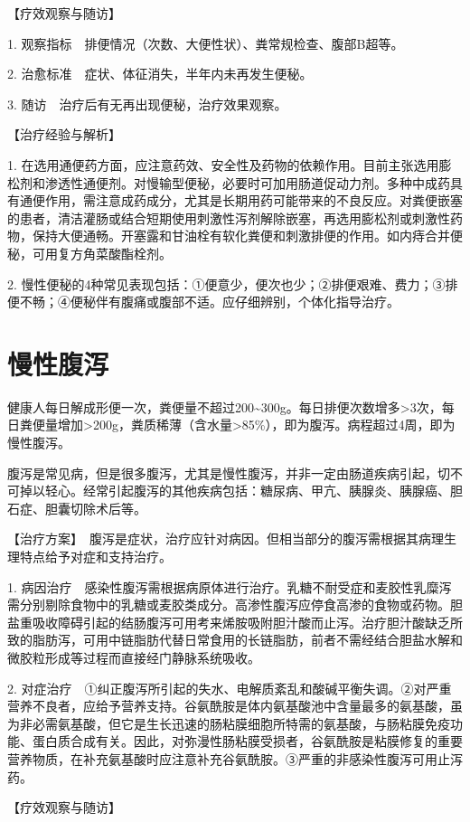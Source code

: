 【疗效观察与随访】

1. 观察指标　排便情况（次数、大便性状）、粪常规检查、腹部B超等。

2. 治愈标准　症状、体征消失，半年内未再发生便秘。

3. 随访　治疗后有无再出现便秘，治疗效果观察。

【治疗经验与解析】

1.
在选用通便药方面，应注意药效、安全性及药物的依赖作用。目前主张选用膨松剂和渗透性通便剂。对慢输型便秘，必要时可加用肠道促动力剂。多种中成药具有通便作用，需注意成药成分，尤其是长期用药可能带来的不良反应。对粪便嵌塞的患者，清洁灌肠或结合短期使用刺激性泻剂解除嵌塞，再选用膨松剂或刺激性药物，保持大便通畅。开塞露和甘油栓有软化粪便和刺激排便的作用。如内痔合并便秘，可用复方角菜酸酯栓剂。

2.
慢性便秘的4种常见表现包括：①便意少，便次也少；②排便艰难、费力；③排便不畅；④便秘伴有腹痛或腹部不适。应仔细辨别，个体化指导治疗。

\section{慢性腹泻}

健康人每日解成形便一次，粪便量不超过200\textasciitilde{}300g。每日排便次数增多\textgreater{}3次，每日粪便量增加\textgreater{}200g，粪质稀薄（含水量\textgreater{}85\%），即为腹泻。病程超过4周，即为慢性腹泻。

腹泻是常见病，但是很多腹泻，尤其是慢性腹泻，并非一定由肠道疾病引起，切不可掉以轻心。经常引起腹泻的其他疾病包括：糖尿病、甲亢、胰腺炎、胰腺癌、胆石症、胆囊切除术后等。

【治疗方案】　腹泻是症状，治疗应针对病因。但相当部分的腹泻需根据其病理生理特点给予对症和支持治疗。

1.
病因治疗　感染性腹泻需根据病原体进行治疗。乳糖不耐受症和麦胶性乳糜泻需分别剔除食物中的乳糖或麦胶类成分。高渗性腹泻应停食高渗的食物或药物。胆盐重吸收障碍引起的结肠腹泻可用考来烯胺吸附胆汁酸而止泻。治疗胆汁酸缺乏所致的脂肪泻，可用中链脂肪代替日常食用的长链脂肪，前者不需经结合胆盐水解和微胶粒形成等过程而直接经门静脉系统吸收。

2.
对症治疗　①纠正腹泻所引起的失水、电解质紊乱和酸碱平衡失调。②对严重营养不良者，应给予营养支持。谷氨酰胺是体内氨基酸池中含量最多的氨基酸，虽为非必需氨基酸，但它是生长迅速的肠粘膜细胞所特需的氨基酸，与肠粘膜免疫功能、蛋白质合成有关。因此，对弥漫性肠粘膜受损者，谷氨酰胺是粘膜修复的重要营养物质，在补充氨基酸时应注意补充谷氨酰胺。③严重的非感染性腹泻可用止泻药。

【疗效观察与随访】

